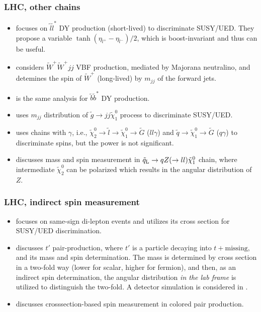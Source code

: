 \documentclass[10pt,a4paper]{article}
\newcommand{\s}[1]{_{\rm #1}}
\begin{document}
\subsubsection{LHC, other chains}
\begin{itemize}
 \item\cite{Barr:2005dz} focuses on $\tilde l \tilde l^*$ DY production (short-lived) to discriminate SUSY/UED.
      They propose a variable $\tanh(\eta_{l^+}-\eta_{l^-})/2$, which is boost-invariant and thus can be useful.

 \item\cite{Alwall:2007ed} considers $\tilde W^+\tilde W^+jj$ VBF production, mediated by Majorana neutralino, and detemines the spin of $\tilde W^+$ (long-lived) by $m_{jj}$ of the forward jets.

 \item\cite{Alves:2007xt} is the same analysis for $\tilde b\tilde b^*$ DY production.

 \item\cite{Csaki:2007xm} uses $m_{jj}$ distribution of $\tilde g\to jj\tilde\chi^0_1$ process to discriminate SUSY/UED.

 \item\cite{Ehrenfeld:2009rt} uses chains with $\gamma$, i.e., $\tilde\chi^0_2\to\tilde l\to\tilde\chi^0_1\to\tilde G$ ($ll\gamma$) and $\tilde q\to \tilde\chi^0_1\to\tilde G$ ($q\gamma$) to discriminate spins, but the power is not significant.
      
 \item \cite{Kim:2011zzg} discusses mass and spin measurement in $\tilde q\s L\to qZ(\to ll)\tilde\chi^0_1$ chain, where intermediate $\tilde\chi^0_2$ can be polarized which results in the angular distribution of $Z$.
 \end{itemize}


\subsubsection{LHC, indirect spin measurement}
\begin{itemize}
 \item \cite{Datta:2005vx} focuses on same-sign di-lepton events and utilizes its cross section for SUSY/UED discrimination.
 \item\cite{Meade:2006dw} discusses $t'$ pair-production, where $t'$ is a particle decaying into $t+\text{missing}$, and its mass and spin determination. The mass is determined by cross section in a two-fold way (lower for scalar, higher for fermion), and then, as an indirect spin determination, the angular distribution {\em in the lab frame} is utilized to distinguish the two-fold.
      A detector simulation is considered in \cite{Hallenbeck:2008hf}.
 \item \cite{Kane:2008kw} discusses crosssection-based spin measurement in colored pair production.
\end{itemize}
\end{document}
